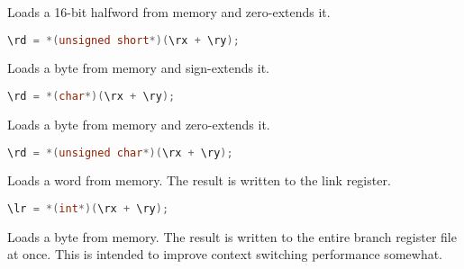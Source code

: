 Loads a 16-bit halfword from memory and zero-extends it.

\begin{lstlisting}[numbers=none, basicstyle=\ttfamily\footnotesize, language=C++]
\rd = *(unsigned short*)(\rx + \ry);
\end{lstlisting}

Loads a byte from memory and sign-extends it.

\begin{lstlisting}[numbers=none, basicstyle=\ttfamily\footnotesize, language=C++]
\rd = *(char*)(\rx + \ry);
\end{lstlisting}

Loads a byte from memory and zero-extends it.

\begin{lstlisting}[numbers=none, basicstyle=\ttfamily\footnotesize, language=C++]
\rd = *(unsigned char*)(\rx + \ry);
\end{lstlisting}

Loads a word from memory. The result is written to the link register.

\begin{lstlisting}[numbers=none, basicstyle=\ttfamily\footnotesize, language=C++]
\lr = *(int*)(\rx + \ry);
\end{lstlisting}

Loads a byte from memory. The result is written to the entire branch register
file at once. This is intended to improve context switching performance
somewhat.

